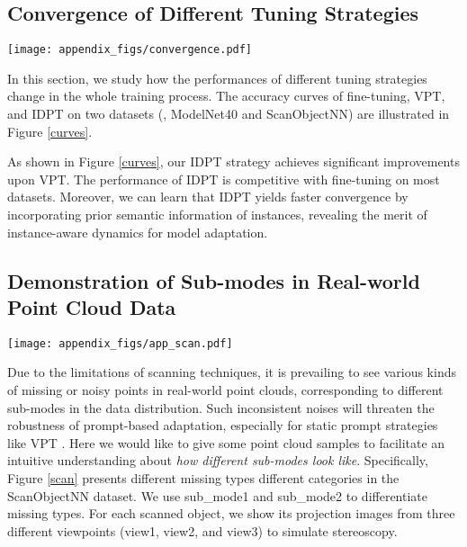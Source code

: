 \documentclass[10pt,twocolumn,letterpaper]{article}
\begin{document}
\subsection{Convergence of Different Tuning Strategies}

\begin{figure*}[h]
\centering
\texttt{[image: appendix\_figs/convergence.pdf]} 
\caption{The classification accuracy curves of fine-tuning, VPT, and our IDPT strategy on two datasets.}
\label{curves}
\end{figure*}

In this section, we study how the performances of different tuning strategies change in the whole training process. 
The accuracy curves of fine-tuning, VPT, and IDPT on two datasets (\ie, ModelNet40 and ScanObjectNN) are illustrated in Figure \ref{curves}. 

As shown in Figure \ref{curves}, our IDPT strategy achieves significant improvements upon VPT. 
The performance of IDPT is competitive with fine-tuning on most datasets. 
Moreover, we can learn that IDPT yields faster convergence by incorporating prior semantic information of instances, revealing the merit of instance-aware dynamics for model adaptation. 






\subsection{Demonstration of Sub-modes in Real-world Point Cloud Data}

\begin{figure*}[h]
\centering
\texttt{[image: appendix\_figs/app\_scan.pdf]} 
\caption{Different sub-modes in each category of ScanObjectNN}
\label{scan}
\end{figure*}

Due to the limitations of scanning techniques, 
it is prevailing to see various kinds of missing or noisy points in real-world point clouds, corresponding to different sub-modes in the data distribution. 
Such inconsistent noises will threaten the robustness of prompt-based adaptation, especially for static prompt strategies like VPT \cite{jia2022visual}.  
Here we would like to give some point cloud samples to facilitate an intuitive understanding about \emph{how different sub-modes look like}. 
Specifically, Figure \ref{scan} presents different missing types \wrt different categories in the ScanObjectNN dataset. 
We use sub\_mode1 and sub\_mode2 to differentiate missing types. 
For each scanned object, we show its projection images from three different viewpoints (\ie view1, view2, and view3) to simulate stereoscopy.
\end{document}
